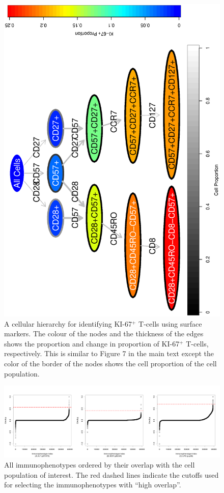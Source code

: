  \begin{figure}[!ht]
    \begin{center}
      \includegraphics[width=.7\textwidth, angle=270]{figs/rchy/figs/PropKI67Overlap}
    \end{center}
    \caption{A cellular hierarchy for identifying KI-67$^+$ T-cells using surface markers. The colour of the nodes and the thickness of the edges shows the proportion and change in proportion of KI-67$^+$ T-cells, respectively.
      This is similar to Figure 7 in the main text except the color of the border of the nodes shows the cell proportion of the cell population.}
    \label{r1:KI67Overlap}
  \end{figure}

\begin{figure}[!ht]
  \begin{center}
    \includegraphics[width=\textwidth]{figs/rchy/figs/overlaps}
  \end{center}
  \caption{All immunophenotypes ordered by their overlap with the cell population of interest. The red dashed lines indicate the cutoffs used for selecting the immunophenotypes with ``high overlap''.}
  \label{r1:overlaps}
\end{figure}


